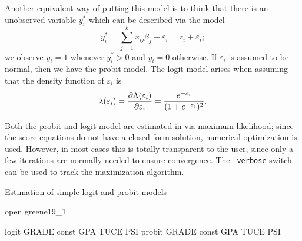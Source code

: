 Another
equivalent way of putting this model is to think that there is an
unobserved variable $y^*_i$ which can be described via the model
\begin{equation}
  \label{eq:qr-latent}
  y^*_i = \sum_{j=1}^k x_{ij} \beta_j + \varepsilon_i = z_i  +
  \varepsilon_i ;
\end{equation}
we observe $y_i = 1$ whenever $y^*_i > 0$ and $y_i = 0$ otherwise. If
$\varepsilon_i$ is assumed to be normal, then we have the probit
model. The logit model arises when assuming that the density function of
$\varepsilon_i$ is 
\[
  \lambda(\varepsilon_i) =
  \frac{\partial \Lambda(\varepsilon_i)}{\partial \varepsilon_i} =
  \frac{e^{-\varepsilon_i}}{(1 + e^{-\varepsilon_i})^2} .
\]

Both the probit and logit model are estimated in  via
maximum likelihood; since the score equations do not have a closed
form solution, numerical optimization is used. However, in most cases
this is totally transparent to the user, since only a few iterations
are normally needed to ensure convergence. The \texttt{--verbose}
switch can be used to track the maximization algorithm.

\begin{script}[htbp]
  \caption{Estimation of simple logit and probit models}
  \label{simple-QR}
\begin{code}
open greene19_1

logit GRADE const GPA TUCE PSI
probit GRADE const GPA TUCE PSI
\end{code}
\end{script}

